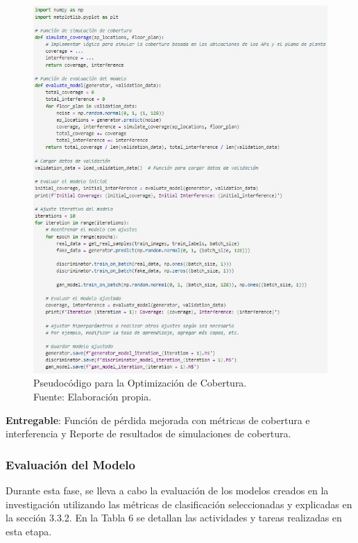 \begin{figure}[H]
	\centering
	\includegraphics[width=1\textwidth]{3/figures/pseudo_cobert.jpg}
	\caption[Pseudocódigo para la Optimización de Cobertura]{Pseudocódigo para la Optimización de Cobertura.\\ Fuente: Elaboración propia.}
	\label{3:9}
\end{figure}

\textbf{Entregable}: Función de pérdida mejorada con métricas de cobertura e interferencia y Reporte de resultados de simulaciones de cobertura.

\subsubsection{Evaluación del Modelo}
Durante esta fase, se lleva a cabo la evaluación de los modelos creados en la investigación utilizando las métricas de clasificación seleccionadas y explicadas en la sección 3.3.2. En la Tabla 6 se detallan las actividades y tareas realizadas en esta etapa.

